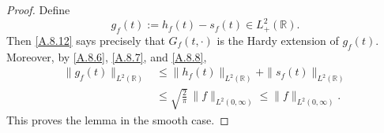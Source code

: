 \documentclass[10pt]{article}
\numberwithin{equation}{section}
\numberwithin{theorem}{section}
\begin{document}
\begin{appendix}
\begin{proof}
Define
\begin{equation}
\label{A.8.13}
g_f(t):=h_f(t)-s_f(t)\in L^2_+(\mathbb R).
\end{equation}
Then \eqref{A.8.12} says precisely that \(G_f(t,\cdot)\) is the Hardy extension of
\(g_f(t)\). Moreover, by \eqref{A.8.6}, \eqref{A.8.7}, and \eqref{A.8.8},
\begin{equation}
\label{A.8.14}
\begin{aligned}
\|g_f(t)\|_{L^2(\mathbb R)}
&\le
\|h_f(t)\|_{L^2(\mathbb R)}
+
\|s_f(t)\|_{L^2(\mathbb R)}  \\
&\le
\sqrt{\frac{2}{\pi}}\,
\|f\|_{L^2(0,\infty)}
\le
\|f\|_{L^2(0,\infty)}.
\end{aligned}
\end{equation}
This proves the lemma in the smooth case.


\end{proof}
\end{appendix}
\end{document}
